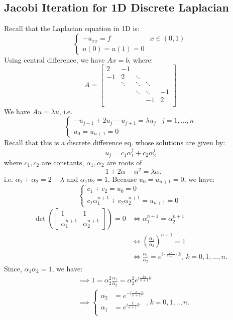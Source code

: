 \documentclass[../main/main.tex]{subfiles}
\begin{document}
\subsection{Jacobi Iteration for 1D Discrete Laplacian}
  Recall that the Laplacian equation in 1D is: \[
\begin{cases}
  -u_{x x} = f& x \in(0,1)\\
  u(0)=u(1)=0
\end{cases}
\] Using central difference, we have $Ax = b$, where: \[
  A = \begin{bmatrix}
    2&-1&&&\\
    -1&2&\ddots&&\\
    &\ddots&\ddots&\ddots&\\
    &&\ddots&\ddots&-1\\
    &&&-1&2\\
  \end{bmatrix}
\]We have $Au = \lambda u$, i.e. \[
  \begin{cases}
  -u_{j-1}+2u_{j}-u_{j+1} =\lambda u_{j} & j=1 , \ldots , n\\
  u_{0}=u_{n+1}=0&
  \end{cases}
\]
Recall that this is a discrete difference eq. whose solutions are given by: \[
u_{j} = c_1 \alpha_{1}^{j} + c_2\alpha_{2}^{j}
\] where $c_1, c_2$ are constants, $\alpha_{1},\alpha_{2}$ are roots of \[-1 +2\alpha -\alpha^2=\lambda \alpha.\] i.e. $\alpha_{1}+\alpha_{2}=2-\lambda$ and $\alpha_{1}\alpha_{2}=1$. Because $u_{0}=u_{n+1}=0$, we have: \[
\begin{cases}
  c_1+c_2 = u_{0}=0\\
  c_1\alpha_{1}^{n+1} + c_2\alpha_{2}^{n+1}= u_{n+1}=0
\end{cases}.\]
\begin{align*}
  \det\left(\begin{bmatrix}
      1&1\\
      \alpha_{1}^{n+1}& \alpha_{2}^{n+1}
    \end{bmatrix}\right)=0 &\iff \alpha_{1}^{n+1} = \alpha_{2}^{n+1}\\
       &\iff \left(\frac{\alpha_{1}}{\alpha_{2}} \right)^{n+1}=1\\
       &\iff \frac{\alpha_{1}}{\alpha_{2}} = e^{i \cdot \frac{2\pi}{n+1}\cdot k },~ k=0,1, \ldots, n
  .\end{align*}
Since, $\alpha_{1}\alpha_{2}=1$, we have:
\begin{align*}
  &\implies 1 = \alpha_{2}^2 \frac{\alpha_{1}}{\alpha_{2}} = \alpha_{2}^2 e^{i \frac{2\pi}{n+1}k}\\
 &\implies \begin{cases}
   \alpha_{2}& = e^{-i \frac{\pi}{n+1}k}  \\
   \alpha_{1}& = e^{i \frac{\pi}{n+1}k}  \\
 \end{cases}, k=0,1, .. , n
  .\end{align*}
\end{document}
